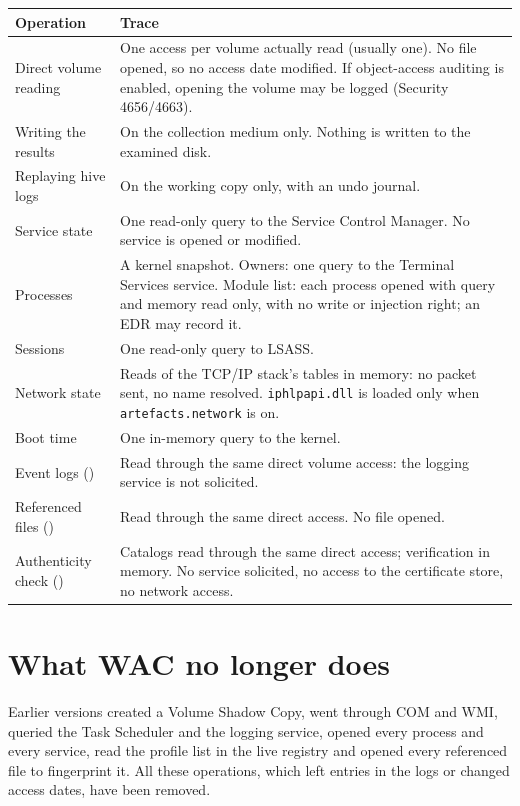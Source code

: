 \documentclass[11pt,a4paper,oneside]{report}
\begin{document}
\begin{longtable}{@{}L{4.3cm}L{10.1cm}@{}}
\toprule
\bfseries Operation & \bfseries Trace \\
\midrule
\endhead
Direct volume reading & One access per volume actually read (usually one). No
  file opened, so no access date modified. If object-access auditing is enabled,
  opening the volume may be logged (Security 4656/4663). \\
Writing the results & On the collection medium only. Nothing is written to the
  examined disk. \\
Replaying hive logs & On the working copy only, with an undo journal. \\
Service state & One read-only query to the Service Control Manager. No service
  is opened or modified. \\
Processes & A kernel snapshot. Owners: one query to the Terminal Services
  service. Module list: each process opened with query and memory read only,
  with no write or injection right; an EDR may record it. \\
Sessions & One read-only query to LSASS. \\
Network state & Reads of the TCP/IP stack's tables in memory: no packet sent,
  no name resolved. \texttt{iphlpapi.dll} is loaded only when
  \texttt{artefacts.network} is on. \\
Boot time & One in-memory query to the kernel. \\
Event logs () & Read through the same direct volume access: the
  logging service is not solicited. \\
Referenced files () & Read through the same direct access. No file
  opened. \\
Authenticity check () & Catalogs read through the same direct
  access; verification in memory. No service solicited, no access to the
  certificate store, no network access. \\
\bottomrule
\end{longtable}

\section{What WAC no longer does}

Earlier versions created a Volume Shadow Copy, went through COM and WMI, queried
the Task Scheduler and the logging service, opened every process and every
service, read the profile list in the live registry and opened every referenced
file to fingerprint it. All these operations, which left entries in the logs or
changed access dates, have been removed.
\end{document}
